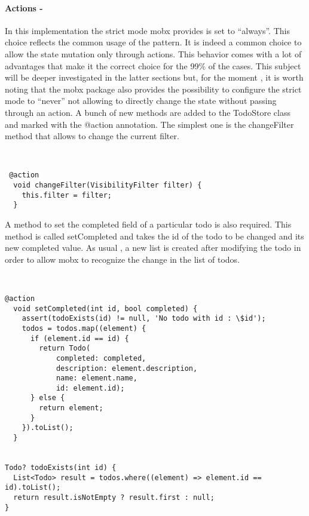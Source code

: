 \paragraph{Actions - }
\label{subpar:todo_app_bloc_core_state}In this implementation the strict mode mobx provides is set to “always”. This choice reflects the common usage of the pattern. It is indeed a common choice to allow the state mutation only through actions. This behavior comes with a lot of advantages that make it the correct choice for the 99\% of the cases. This subject will be deeper investigated in the latter sections but, for the moment , it is worth noting that the mobx package also provides the possibility to configure the strict mode to “never” not allowing to directly change the state without passing through an action.  A bunch of new methods are added to the TodoStore class and marked with the @action annotation. The simplest one is the changeFilter method that allows to change the current filter.
\begin{code}
\mbox{}\\
 \mbox{}
		\label{code:2.14}
\begin{verbatim} 
 @action
  void changeFilter(VisibilityFilter filter) {
    this.filter = filter;
  }
\end{verbatim}
\mbox{}
\end{code}
A method to set the completed field of a particular todo is also required. This method is called setCompleted and takes the id of the todo to be changed and its new completed value. As usual , a new list is created after modifying the todo in order to allow mobx to recognize the change in the list of todos.
\begin{code}
\mbox{}\\
 \mbox{}
		\label{code:2.14}
\begin{verbatim}
@action
  void setCompleted(int id, bool completed) {
    assert(todoExists(id) != null, 'No todo with id : \$id');
    todos = todos.map((element) {
      if (element.id == id) {
        return Todo(
            completed: completed,
            description: element.description,
            name: element.name,
            id: element.id);
      } else {
        return element;
      }
    }).toList();
  }


Todo? todoExists(int id) {
  List<Todo> result = todos.where((element) => element.id == id).toList();
  return result.isNotEmpty ? result.first : null;
}
\end{verbatim}
\mbox{}
\end{code}

